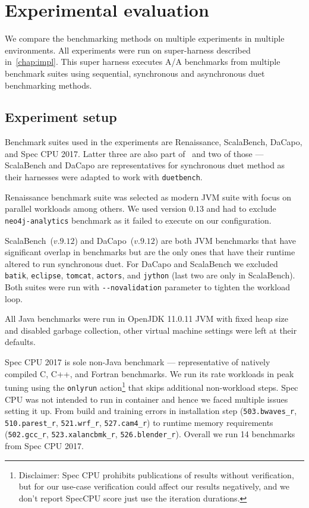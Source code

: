 \chapter{Experimental evaluation}
\label{chap:evaluation}

We compare the benchmarking methods on multiple experiments in multiple environments.
All experiments were run on super-harness described in~\cref{chap:impl}.
This super harness executes A/A benchmarks from multiple benchmark suites using sequential, synchronous and asynchronous duet benchmarking methods.

\section{Experiment setup}
\label{sec:experiment_setup}

Benchmark suites used in the experiments are Renaissance, ScalaBench, DaCapo, and  Spec CPU 2017.
Latter three are also part of~\citet{bulej2020duet} and two of those --- ScalaBench and DaCapo are representatives for synchronous duet method as their harnesses were adapted to work with \lstinline{duetbench}.

Renaissance benchmark suite was selected as modern JVM suite with focus on parallel workloads among others\cite{prokopec2019renaissance}.
We used version $0.13$ and had to exclude \lstinline{neo4j-analytics} benchmark as it failed to execute on our configuration.

ScalaBench~($v.9.12$) and DaCapo~($v.9.12$) are both JVM benchmarks that have significant overlap in benchmarks but are the only ones that have their runtime altered to run synchronous duet.
For DaCapo and ScalaBench we excluded \lstinline{batik}, \lstinline{eclipse}, \lstinline{tomcat}, \lstinline{actors}, and \lstinline{jython} (last two are only in ScalaBench).
Both suites were run with \lstinline{--novalidation} parameter to tighten the workload loop.

All Java benchmarks were run in OpenJDK 11.0.11 JVM with fixed heap size and disabled garbage collection, other virtual machine settings were left at their defaults.

Spec CPU 2017 is sole non-Java benchmark --- representative of natively compiled C, C++, and Fortran benchmarks.
We run its rate workloads in peak tuning using the \lstinline{onlyrun} action\footnote{Disclaimer: Spec CPU prohibits publications of results without verification, but for our use-case verification could affect our results negatively, and we don't report SpecCPU score just use the iteration durations.} that skips additional non-workload steps.
Spec CPU was not intended to run in container and hence we faced multiple issues setting it up.
From build and training errors in installation step (\lstinline{503.bwaves_r}, \lstinline{510.parest_r}, \lstinline{521.wrf_r}, \lstinline{527.cam4_r}) to runtime memory requirements (\lstinline{502.gcc_r}, \lstinline{523.xalancbmk_r}, \lstinline{526.blender_r}).
Overall we run 14 benchmarks from Spec CPU 2017.

